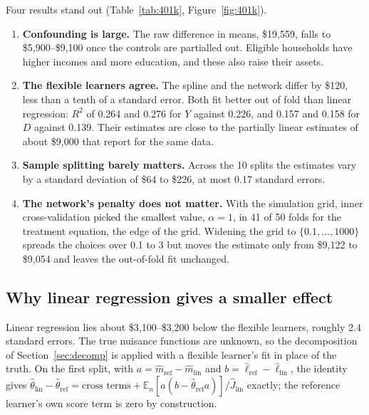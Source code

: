\documentclass[11pt,a4paper]{article}
\newcommand{\En}{\mathbb{E}_n}
\begin{document}
Four results stand out (Table~\ref{tab:401k}, Figure~\ref{fig:401k}).
\begin{enumerate}
\item \textbf{Confounding is large.} The raw difference in means, \$19,559, falls to \$5,900--\$9,100 once the controls are partialled out. Eligible households have higher incomes and more education, and these also raise their assets.
\item \textbf{The flexible learners agree.} The spline and the network differ by \$120, less than a tenth of a standard error. Both fit better out of fold than linear regression: $R^2$ of 0.264 and 0.276 for $Y$ against 0.226, and 0.157 and 0.158 for $D$ against 0.139. Their estimates are close to the partially linear estimates of about \$9,000 that \citet{chernozhukov2018} report for the same data.
\item \textbf{Sample splitting barely matters.} Across the 10 splits the estimates vary by a standard deviation of \$64 to \$226, at most 0.17 standard errors.
\item \textbf{The network's penalty does not matter.} With the simulation grid, inner cross-validation picked the smallest value, $\alpha=1$, in 41 of 50 folds for the treatment equation, the edge of the grid. Widening the grid to $\{0.1,\dots,1000\}$ spreads the choices over 0.1 to 3 but moves the estimate only from \$9,122 to \$9,054 and leaves the out-of-fold fit unchanged.
\end{enumerate}

\subsection{Why linear regression gives a smaller effect}

Linear regression lies about \$3,100--\$3,200 below the flexible learners, roughly 2.4 standard errors. The true nuisance functions are unknown, so the decomposition of Section~\ref{sec:decomp} is applied with a flexible learner's fit in place of the truth. On the first split, with $a=\hat m_{\mathrm{ref}}-\hat m_{\mathrm{lin}}$ and $b=\hat\ell_{\mathrm{ref}}-\hat\ell_{\mathrm{lin}}$, the identity gives $\hat\theta_{\mathrm{lin}}-\hat\theta_{\mathrm{ref}}=\text{cross terms}+\En[a(b-\hat\theta_{\mathrm{ref}}a)]/\hat J_{\mathrm{lin}}$ exactly; the reference learner's own score term is zero by construction.
\end{document}
